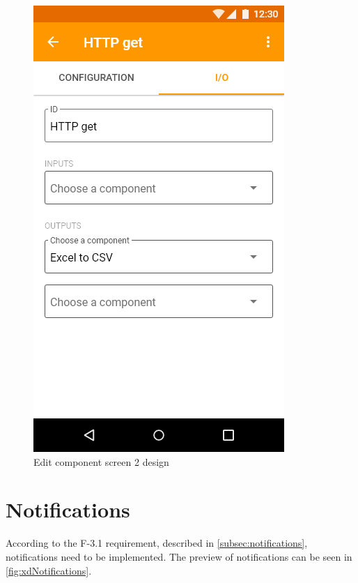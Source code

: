 \begin{figure}
\begin{minipage}[b]{0.32\textwidth}
    	\includegraphics[width=\textwidth]{pics/xd/Edit component - io.png}
    	\caption[Edit component screen 2]{Edit component screen 2 design}\label{fig:xdEditComponent2}
    \end{minipage}
\end{figure}

\section{Notifications}
According to the F-3.1 requirement, described in \autoref{subsec:notifications}, notifications need to be implemented.
The preview of notifications can be seen in \autoref{fig:xdNotifications}.

